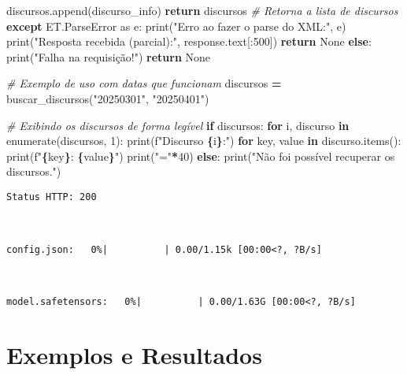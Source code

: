 \documentclass[
]{article}
\newenvironment{Shaded}{\begin{snugshade}}{\end{snugshade}}
\newcommand{\BuiltInTok}[1]{#1}
\newcommand{\CommentTok}[1]{\textcolor[rgb]{0.56,0.35,0.01}{\textit{#1}}}
\newcommand{\ControlFlowTok}[1]{\textcolor[rgb]{0.13,0.29,0.53}{\textbf{#1}}}
\newcommand{\DecValTok}[1]{\textcolor[rgb]{0.00,0.00,0.81}{#1}}
\newcommand{\ImportTok}[1]{#1}
\newcommand{\KeywordTok}[1]{\textcolor[rgb]{0.13,0.29,0.53}{\textbf{#1}}}
\newcommand{\NormalTok}[1]{#1}
\newcommand{\OperatorTok}[1]{\textcolor[rgb]{0.81,0.36,0.00}{\textbf{#1}}}
\newcommand{\SpecialCharTok}[1]{\textcolor[rgb]{0.81,0.36,0.00}{\textbf{#1}}}
\newcommand{\SpecialStringTok}[1]{\textcolor[rgb]{0.31,0.60,0.02}{#1}}
\newcommand{\StringTok}[1]{\textcolor[rgb]{0.31,0.60,0.02}{#1}}
\newcommand{\VariableTok}[1]{\textcolor[rgb]{0.00,0.00,0.00}{#1}}
\begin{document}
\begin{Shaded}
\begin{Highlighting}[]
\NormalTok{                discursos.append(discurso\_info)}
            \ControlFlowTok{return}\NormalTok{ discursos  }\CommentTok{\# Retorna a lista de discursos}
        \ControlFlowTok{except}\NormalTok{ ET.ParseError }\ImportTok{as}\NormalTok{ e:}
            \BuiltInTok{print}\NormalTok{(}\StringTok{"Erro ao fazer o parse do XML:"}\NormalTok{, e)}
            \BuiltInTok{print}\NormalTok{(}\StringTok{"Resposta recebida (parcial):"}\NormalTok{, response.text[:}\DecValTok{500}\NormalTok{])}
            \ControlFlowTok{return} \VariableTok{None}
    \ControlFlowTok{else}\NormalTok{:}
        \BuiltInTok{print}\NormalTok{(}\StringTok{"Falha na requisição!"}\NormalTok{)}
        \ControlFlowTok{return} \VariableTok{None}

\CommentTok{\# Exemplo de uso com datas que funcionam}
\NormalTok{discursos }\OperatorTok{=}\NormalTok{ buscar\_discursos(}\StringTok{"20250301"}\NormalTok{, }\StringTok{"20250401"}\NormalTok{)}

\CommentTok{\# Exibindo os discursos de forma legível}
\ControlFlowTok{if}\NormalTok{ discursos:}
    \ControlFlowTok{for}\NormalTok{ i, discurso }\KeywordTok{in} \BuiltInTok{enumerate}\NormalTok{(discursos, }\DecValTok{1}\NormalTok{):}
        \BuiltInTok{print}\NormalTok{(}\SpecialStringTok{f"Discurso }\SpecialCharTok{\{}\NormalTok{i}\SpecialCharTok{\}}\SpecialStringTok{:"}\NormalTok{)}
        \ControlFlowTok{for}\NormalTok{ key, value }\KeywordTok{in}\NormalTok{ discurso.items():}
            \BuiltInTok{print}\NormalTok{(}\SpecialStringTok{f"}\SpecialCharTok{\{}\NormalTok{key}\SpecialCharTok{\}}\SpecialStringTok{: }\SpecialCharTok{\{}\NormalTok{value}\SpecialCharTok{\}}\SpecialStringTok{"}\NormalTok{)}
        \BuiltInTok{print}\NormalTok{(}\StringTok{"="}\OperatorTok{*}\DecValTok{40}\NormalTok{)}
\ControlFlowTok{else}\NormalTok{:}
    \BuiltInTok{print}\NormalTok{(}\StringTok{"Não foi possível recuperar os discursos."}\NormalTok{)}
\end{Highlighting}
\end{Shaded}

\begin{verbatim}
Status HTTP: 200



config.json:   0%|          | 0.00/1.15k [00:00<?, ?B/s]



model.safetensors:   0%|          | 0.00/1.63G [00:00<?, ?B/s]
\end{verbatim}

\section{Exemplos e Resultados}\label{exemplos-e-resultados}
\end{document}

